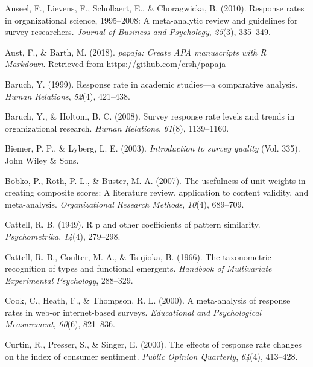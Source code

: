 \documentclass[
  ,man,floatsintext]{apa6}
\newlength{\cslhangindent}
\newlength{\cslentryspacingunit} %
\newenvironment{CSLReferences}[2] %
 {%
  \setlength{\parindent}{0pt}
  \ifodd #1
  \let\oldpar\par
  \def\par{\hangindent=\cslhangindent\oldpar}
  \fi
  \setlength{\parskip}{#2\cslentryspacingunit}
 }%
 {}
\begin{document}
\hypertarget{refs}{}
\begin{CSLReferences}{1}{0}
\leavevmode{}%
Anseel, F., Lievens, F., Schollaert, E., \& Choragwicka, B. (2010). Response rates in organizational science, 1995--2008: A meta-analytic review and guidelines for survey researchers. \emph{Journal of Business and Psychology}, \emph{25}(3), 335--349.

\leavevmode{}%
Aust, F., \& Barth, M. (2018). \emph{{papaja}: {Create} {APA} manuscripts with {R Markdown}}. Retrieved from \url{https://github.com/crsh/papaja}

\leavevmode{}%
Baruch, Y. (1999). Response rate in academic studies---a comparative analysis. \emph{Human Relations}, \emph{52}(4), 421--438.

\leavevmode{}%
Baruch, Y., \& Holtom, B. C. (2008). Survey response rate levels and trends in organizational research. \emph{Human Relations}, \emph{61}(8), 1139--1160.

\leavevmode{}%
Biemer, P. P., \& Lyberg, L. E. (2003). \emph{Introduction to survey quality} (Vol. 335). John Wiley \& Sons.

\leavevmode{}%
Bobko, P., Roth, P. L., \& Buster, M. A. (2007). The usefulness of unit weights in creating composite scores: A literature review, application to content validity, and meta-analysis. \emph{Organizational Research Methods}, \emph{10}(4), 689--709.

\leavevmode{}%
Cattell, R. B. (1949). R p and other coefficients of pattern similarity. \emph{Psychometrika}, \emph{14}(4), 279--298.

\leavevmode{}%
Cattell, R. B., Coulter, M. A., \& Tsujioka, B. (1966). The taxonometric recognition of types and functional emergents. \emph{Handbook of Multivariate Experimental Psychology}, 288--329.

\leavevmode{}%
Cook, C., Heath, F., \& Thompson, R. L. (2000). A meta-analysis of response rates in web-or internet-based surveys. \emph{Educational and Psychological Measurement}, \emph{60}(6), 821--836.

\leavevmode{}%
Curtin, R., Presser, S., \& Singer, E. (2000). The effects of response rate changes on the index of consumer sentiment. \emph{Public Opinion Quarterly}, \emph{64}(4), 413--428.


\end{CSLReferences}
\end{document}
